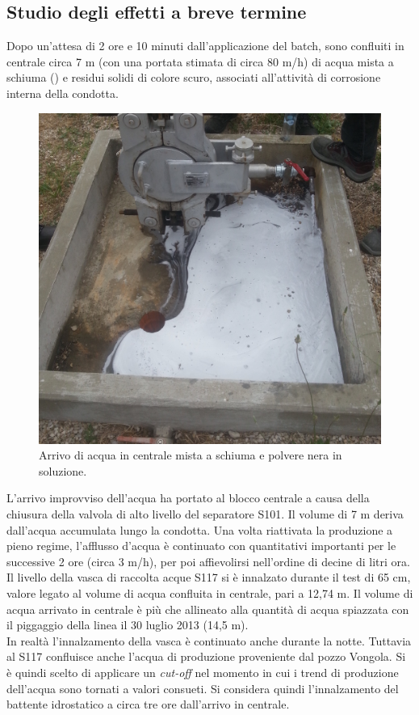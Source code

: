 \subsection{Studio degli effetti a breve termine}
Dopo un'attesa di 2 ore e 10 minuti dall'applicazione del batch, sono confluiti in centrale circa 7 m (con una portata stimata di circa 80 m/h) di acqua mista a schiuma () e residui solidi di colore scuro, associati all'attività di corrosione interna della condotta.
\begin{figure}[htbp]
    \centering
    \includegraphics[width=.5\textwidth]{fig/test/arrivo-centrale}
    \caption{Arrivo di acqua in centrale mista a schiuma e polvere nera in soluzione.} 
    \label{fig:test-arrivocentrale}
\end{figure}
L'arrivo improvviso dell'acqua ha portato al blocco centrale a causa della chiusura della valvola di alto livello del separatore S101. Il volume di 7 m deriva dall'acqua accumulata lungo la condotta. Una volta riattivata la produzione a pieno regime, l'afflusso d'acqua è continuato con quantitativi importanti per le successive 2 ore (circa 3 m/h), per poi affievolirsi nell'ordine di decine di litri ora. Il livello della vasca di raccolta acque S117 si è innalzato durante il test di 65 cm, valore legato al volume di acqua confluita in centrale, pari a 12,74 m. Il volume di acqua arrivato in centrale è più che allineato alla quantità di acqua spiazzata con il piggaggio della linea il 30 luglio 2013 (14,5 m).\\
In realtà l'innalzamento della vasca è continuato anche durante la notte. Tuttavia al S117 confluisce anche l'acqua di produzione proveniente dal pozzo Vongola. Si è quindi scelto di applicare un \textit{cut-off} nel momento in cui i trend di produzione dell'acqua sono tornati a valori consueti. Si considera quindi l'innalzamento del battente idrostatico a circa tre ore dall'arrivo in centrale.\\
